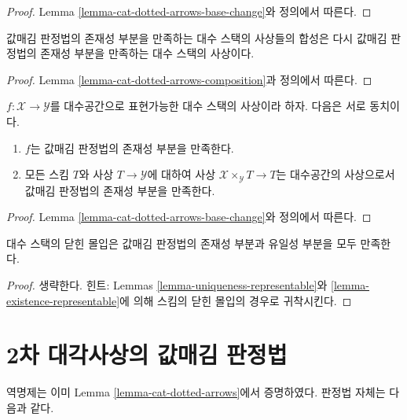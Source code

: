 \begin{proof}
Lemma \ref{lemma-cat-dotted-arrows-base-change}와 정의에서 따른다.
\end{proof}

\begin{lemma}
\label{lemma-composition-existence}
값매김 판정법의 존재성 부분을 만족하는 대수 스택의 사상들의 합성은 다시
값매김 판정법의 존재성 부분을 만족하는 대수 스택의 사상이다.
\end{lemma}

\begin{proof}
Lemma \ref{lemma-cat-dotted-arrows-composition}과 정의에서 따른다.
\end{proof}

\begin{lemma}
\label{lemma-existence-representable}
$f : \mathcal{X} \to \mathcal{Y}$를 대수공간으로 표현가능한 대수 스택의
사상이라 하자. 다음은 서로 동치이다.
\begin{enumerate}
\item $f$는 값매김 판정법의 존재성 부분을 만족한다.
\item 모든 스킴 $T$와 사상 $T \to \mathcal{Y}$에 대하여 사상
$\mathcal{X} \times_\mathcal{Y} T \to T$는 대수공간의 사상으로서
값매김 판정법의 존재성 부분을 만족한다.
\end{enumerate}
\end{lemma}

\begin{proof}
Lemma \ref{lemma-cat-dotted-arrows-base-change}와 정의에서 따른다.
\end{proof}

\begin{lemma}
\label{lemma-closed-immersion-valuative-criteria}
대수 스택의 닫힌 몰입은 값매김 판정법의 존재성 부분과 유일성 부분을 모두
만족한다.
\end{lemma}

\begin{proof}
생략한다. 힌트: Lemmas \ref{lemma-uniqueness-representable}와
\ref{lemma-existence-representable}에 의해 스킴의 닫힌 몰입의 경우로
귀착시킨다.
\end{proof}





\section{2차 대각사상의 값매김 판정법}
\label{section-valuative-second}

\noindent
역명제는 이미 Lemma \ref{lemma-cat-dotted-arrows}에서 증명하였다. 판정법
자체는 다음과 같다.

